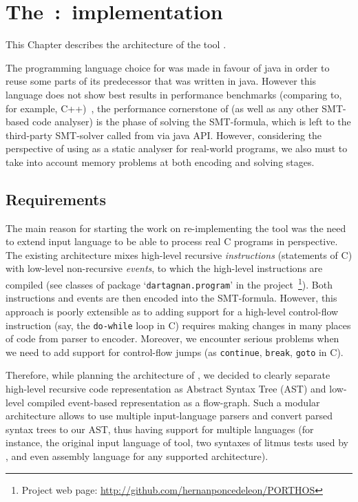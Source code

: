 \chapter{\nohyphens{The~\mousquetaires:~implementation}}
\label{ch:impl}

This Chapter describes the architecture of the tool \mousquetaires.

The programming language choice for \mousquetaires was made in favour of java in order to reuse some parts of its predecessor \Porthos that was written in java. However this language does not show best results in performance benchmarks (comparing to, for example, C++)~\cite{TODO}, the performance cornerstone of \mousquetaires (as well as any other SMT-based code analyser) is the phase of solving the SMT-formula, which is left to the third-party SMT-solver called from \mousquetaires via java API. However, considering the perspective of using \mousquetaires as a static analyser for real-world programs, we also must to take into account memory problems at both encoding and solving stages. 

\section{Requirements}
\label{ch:impl:requirements}

The main reason for starting the work on re-implementing the \Porthos tool was the need to extend input language to be able to process real C programs in perspective. The existing \Porthos architecture mixes high-level recursive \textit{instructions} (statements of C) with low-level non-recursive \textit{events}, to which the high-level instructions are compiled (see classes of package `\texttt{dartagnan.program}' in the \Porthos project~\footnote{Project web page: \url{http://github.com/hernanponcedeleon/PORTHOS}}). Both instructions and events are then encoded into the SMT-formula. However, this approach is poorly extensible as to adding support for a high-level control-flow instruction (say, the \texttt{do-while} loop in C) requires making changes in many places of code from parser to encoder. Moreover, we encounter serious problems when we need to add support for control-flow jumps (as \texttt{continue}, \texttt{break}, \texttt{goto} in C).

Therefore, while planning the architecture of \mousquetaires, we decided to clearly separate high-level recursive code representation as Abstract Syntax Tree (AST) and low-level compiled event-based representation as a flow-graph. Such a modular architecture allows to use multiple input-language parsers and convert parsed syntax trees to our AST, thus having support for multiple languages (for instance, the original input language of \Porthos tool, two syntaxes of litmus tests used by , and even assembly language for any supported architecture).


